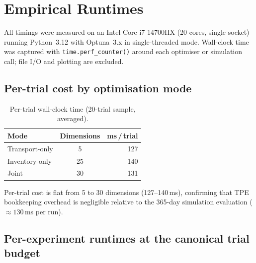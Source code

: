 
\section*{Empirical Runtimes}
\label{appn:runtimes}

All timings were measured on an Intel Core i7-14700HX (20 cores,
single socket) running Python~3.12 with Optuna~3.x in single-threaded
mode.  Wall-clock time was captured with \texttt{time.perf\_counter()}
around each optimiser or simulation call; file I/O and plotting are
excluded.

\subsection*{Per-trial cost by optimisation mode}

\begin{table}[H]
  \centering
  \caption{Per-trial wall-clock time (20-trial sample, averaged).}
  \label{tab:rt-per-trial}
  \begin{tabular}{@{}lcr@{}}
    \toprule
    Mode & Dimensions & ms\,/\,trial \\
    \midrule
    Transport-only & 5  & 127 \\
    Inventory-only & 25 & 140 \\
    Joint          & 30 & 131 \\
    \bottomrule
  \end{tabular}
\end{table}
Per-trial cost is flat from 5 to 30 dimensions (127--140\,ms),
confirming that TPE bookkeeping overhead is negligible relative to the
365-day simulation evaluation ($\approx130$\,ms per run).

\subsection*{Per-experiment runtimes at the canonical trial budget}

